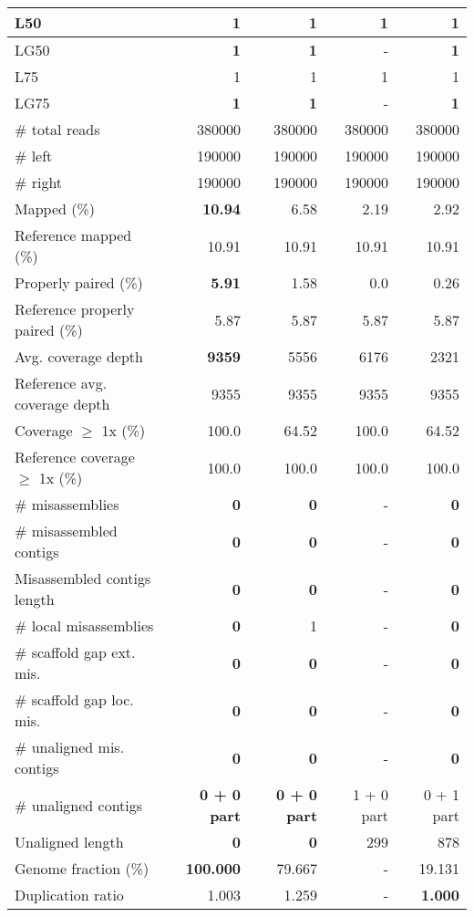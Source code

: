 \documentclass[12pt,a4paper]{article}
\begin{document}
\begin{table}[ht]
\begin{center}
\begin{tabular}{|l*{4}{|r}|}
L50 & 1 & 1 & 1 & 1 \\ \hline
LG50 & {\bf 1} & {\bf 1} & - & {\bf 1} \\ \hline
L75 & 1 & 1 & 1 & 1 \\ \hline
LG75 & {\bf 1} & {\bf 1} & - & {\bf 1} \\ \hline
\# total reads & 380000 & 380000 & 380000 & 380000 \\ \hline
\# left & 190000 & 190000 & 190000 & 190000 \\ \hline
\# right & 190000 & 190000 & 190000 & 190000 \\ \hline
Mapped (\%) & {\bf 10.94} & 6.58 & 2.19 & 2.92 \\ \hline
Reference mapped (\%) & 10.91 & 10.91 & 10.91 & 10.91 \\ \hline
Properly paired (\%) & {\bf 5.91} & 1.58 & 0.0 & 0.26 \\ \hline
Reference properly paired (\%) & 5.87 & 5.87 & 5.87 & 5.87 \\ \hline
Avg. coverage depth & {\bf 9359} & 5556 & 6176 & 2321 \\ \hline
Reference avg. coverage depth & 9355 & 9355 & 9355 & 9355 \\ \hline
Coverage $\geq$ 1x (\%) & 100.0 & 64.52 & 100.0 & 64.52 \\ \hline
Reference coverage $\geq$ 1x (\%) & 100.0 & 100.0 & 100.0 & 100.0 \\ \hline
\# misassemblies & {\bf 0} & {\bf 0} & - & {\bf 0} \\ \hline
\# misassembled contigs & {\bf 0} & {\bf 0} & - & {\bf 0} \\ \hline
Misassembled contigs length & {\bf 0} & {\bf 0} & - & {\bf 0} \\ \hline
\# local misassemblies & {\bf 0} & 1 & - & {\bf 0} \\ \hline
\# scaffold gap ext. mis. & {\bf 0} & {\bf 0} & - & {\bf 0} \\ \hline
\# scaffold gap loc. mis. & {\bf 0} & {\bf 0} & - & {\bf 0} \\ \hline
\# unaligned mis. contigs & {\bf 0} & {\bf 0} & - & {\bf 0} \\ \hline
\# unaligned contigs & {\bf 0 + 0 part} & {\bf 0 + 0 part} & 1 + 0 part & 0 + 1 part \\ \hline
Unaligned length & {\bf 0} & {\bf 0} & 299 & 878 \\ \hline
Genome fraction (\%) & {\bf 100.000} & 79.667 & - & 19.131 \\ \hline
Duplication ratio & 1.003 & 1.259 & - & {\bf 1.000} \\ \hline

\end{tabular}
\end{center}
\end{table}
\end{document}
